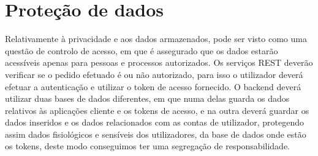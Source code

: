 \section{Proteção de dados}
\label{cap6:protecaodados}


Relativamente à privacidade e aos dados armazenados, pode ser visto como uma questão de controlo de acesso, em que é assegurado que os dados estarão acessíveis apenas para pessoas e processos autorizados. Os serviços \gls{REST} deverão verificar se o pedido efetuado é ou não autorizado, para isso o utilizador deverá efetuar a autenticação e utilizar o token de acesso fornecido. O backend deverá utilizar duas bases de dados diferentes, em que numa delas guarda os dados relativos às aplicações cliente e os tokens de acesso, e na outra deverá guardar os dados inseridos e os dados relacionados com as contas de utilizador, protegendo assim dados fisiológicos e sensíveis dos utilizadores, da base de dados onde estão os tokens, deste modo conseguimos ter uma segregação de responsabilidade.

\cleardoublepage